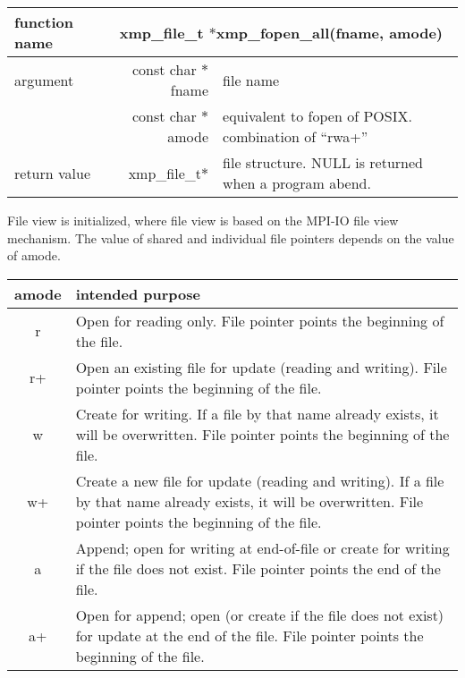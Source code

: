    \begin{table}[h]
    \begin{center}
      \begin{tabular}{|l|r|p{90mm}|}
      \hline
      {\bf function name}  & \multicolumn{2}{c|}{\bf xmp\_file\_t
      $*$xmp\_fopen\_all(fname, amode)}  \\ \hline \hline
      argument & const char $*$fname & file name \\ \cline{2-3}
      & const char $*$amode & equivalent to fopen of POSIX. combination
	      of ``rwa+'' \\ \hline
      return value & xmp\_file\_t$*$ & file structure. NULL is returned
	      when a program abend. \\ \hline
      \end{tabular}
     \end{center}
    \label{tb:aaa}
   \end{table}

   File view is initialized, where file view is based on the MPI-IO file
   view mechanism. The value of shared and individual file pointers
   depends on the value of amode.

   \begin{table}[h]
     \begin{center}
    \label{tb:xxx}
    \begin{tabular}{|c|p{120mm}|}
      \hline
     amode & intended purpose \\ \hline \hline
     r &  Open for reading only. File pointer points the beginning of
	 the file.\\ \hline
     r+ & Open an existing file for update (reading and writing). File
	 pointer points the beginning of the file. \\ \hline
     w &  Create for writing. If a file by that name already exists, it
	 will be overwritten. File pointer points the beginning of the file. \\ \hline
     w+ & Create a new file for update (reading and writing). If a file
	 by that name already exists, it will be overwritten. File
	 pointer points the beginning of the file. \\ \hline
     a & Append; open for writing at end-of-file or create for writing
	 if the file does not exist. File pointer points the end of the file. \\ \hline
     a+ & Open for append; open (or create if the file does not exist)
	 for update at the end of the file. File pointer points the
	 beginning of the file. \\ \hline
    \end{tabular}
   \end{center}
   \end{table}

